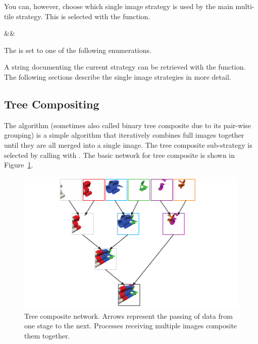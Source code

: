 You can, however, choose which single image strategy is used by the main
multi-tile strategy.  This is selected with the
 function.

\begin{Table}{3}
  \textC{(}&&\quad\textC{);}
\end{Table}

The  is set to one of the following enumerations.



A string documenting the current strategy can be retrieved with the
 function.  The following sections
describe the single image strategies in more detail.

\subsection{Tree Compositing}


The  algorithm (sometimes also called binary tree
composite due to its pair-wise grouping) is a simple algorithm that
iteratively combines full images together until they are all merged into a
single image.  The tree composite sub-strategy is selected by calling
 with
.  The basic network for tree
composite is shown in Figure~\ref{fig:BinaryTree}.

\begin{figure}
  \centering
  \includegraphics{images/BinaryTree}
  \caption[Tree composite network.]{Tree composite network.  Arrows
    represent the passing of data from one stage to the next.  Processes
    receiving multiple images composite them together.}
  \label{fig:BinaryTree}
\end{figure}

